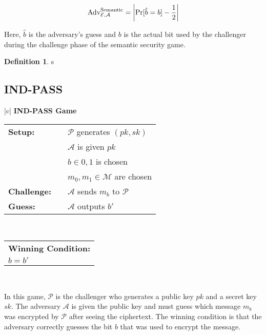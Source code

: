 \documentclass[12pt,openany]{book}
\theoremstyle{definition}
\newtheorem{definition}{Definition}[chapter]
\newcommand{\A}{\mathcal{A}}
\newcommand{\E}{\mathcal{E}}
\newcommand{\Adv}{\textnormal{Adv}}
\begin{document}
	\begin{align*}
		\Adv_{\E, \A}^{\text{Semantic}} = \left| \Pr[\hat{b} = b] - \frac{1}{2} \right|
	\end{align*}
	
	Here, $\hat{b}$ is the adversary's guess and $b$ is the actual bit used by the challenger during the challenge phase of the semantic security game.
	
	
	\begin{tcolorbox}[colback=white,colframe=defcolor, title={\color{white}\bf Semantic Secure}]
		\begin{definition}
			s
		\end{definition}
	\end{tcolorbox}
	\subsection{IND-PASS}
	\begin{center}
		\begin{tabular}{|c|}
			\hline
			\textbf{IND-PASS Game} \\
			\hline
			\begin{tabular}{lcl}
				\textbf{Setup:} & & $\mathcal{P}$ generates $(pk,sk)$ \\
				& & $\mathcal{A}$ is given $pk$ \\
				& & $b \in {0,1}$ is chosen \\
				& & $m_0,m_1 \in \mathcal{M}$ are chosen \\
				\textbf{Challenge:} & & $\mathcal{A}$ sends $m_b$ to $\mathcal{P}$ \\
				\textbf{Guess:} & & $\mathcal{A}$ outputs $b'$ \\
			\end{tabular} \\
			\hline
			\begin{tabular}{l}
				\textbf{Winning Condition:} \\
				$b=b'$ \\
			\end{tabular} \\
			\hline
		\end{tabular}
	\end{center}
	
	In this game, $\mathcal{P}$ is the challenger who generates a public key $pk$ and a secret key $sk$. The adversary $\mathcal{A}$ is given the public key and must guess which message $m_b$ was encrypted by $\mathcal{P}$ after seeing the ciphertext. The winning condition is that the adversary correctly guesses the bit $b$ that was used to encrypt the message.
	
\end{document}
